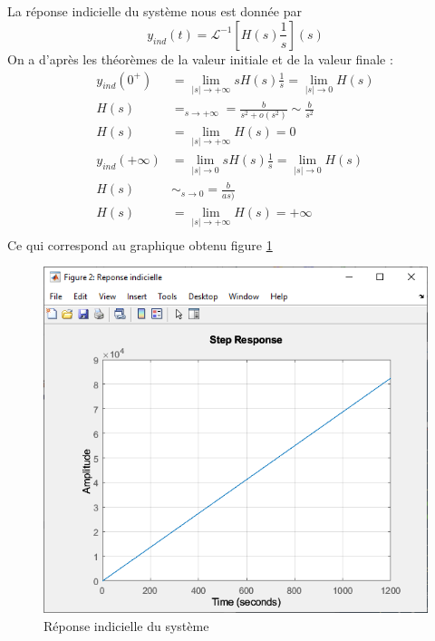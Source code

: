\documentclass{article}
\newcommand{\Lp}{\mathcal{L}}
\begin{document}
\subsection{}
La réponse indicielle du système nous est donnée par
\begin{equation*}
    y_{ind}(t)=\Lp^{-1}[H(s)\frac{1}{s}](s)
\end{equation*}
On a d'après les théorèmes de la valeur initiale et de la valeur finale :
\begin{align*}
    y_{ind}(0^+)&=\lim_{|s|\rightarrow+\infty}sH(s)\frac{1}{s}=\lim_{|s|\rightarrow0}H(s)\\
    H(s)&=_{s\rightarrow+\infty}=\frac{b}{s^2+o(s^2)}\sim\frac{b}{s^2}\\
    H(s)&=\lim_{|s|\rightarrow+\infty}H(s)=0\\
    y_{ind}(+\infty)&=\lim_{|s|\rightarrow0}sH(s)\frac{1}{s}=\lim_{|s|\rightarrow0}H(s)\\
    H(s)&\sim_{s\rightarrow0}=\frac{b}{as)}\\
    H(s)&=\lim_{|s|\rightarrow+\infty}H(s)=+\infty\\
\end{align*}
Ce qui correspond au graphique obtenu figure \ref{fig:step113}
\begin{figure}[h]
    \centering
    \includegraphics[width=0.5\linewidth]{step113.PNG}
    \caption{Réponse indicielle du système}
    \label{fig:step113}
\end{figure}
\end{document}
